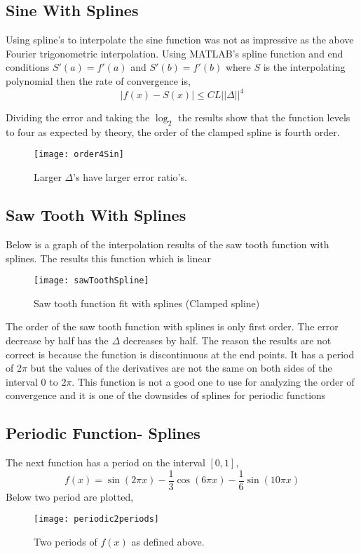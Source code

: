 \documentclass[]{article}
\begin{document}
\subsection*{Sine With Splines}
Using spline's to interpolate the sine function was not as impressive as the above Fourier trigonometric interpolation. Using MATLAB's spline function and end conditions $ S'(a) = f'(a) $ and $ S'(b) = f'(b) $ where $ S $ is the interpolating polynomial then the rate of convergence is, 
\[
| f(x) - S(x)| \leq C L ||\Delta||^4 
\]

Dividing the error and taking the $ \log_2 $ the results show that the function levels to four as expected by theory, the order of the clamped spline is fourth order. 
\begin{figure}[H]
	\centering
	\texttt{[image: order4Sin]}
	\caption{Larger $ \Delta $'s have larger error ratio's.}
\end{figure}

\subsection*{Saw Tooth With Splines}
Below is a graph of the interpolation results of the saw tooth function with splines. The results this function which is linear
\begin{figure}[H]
	\centering
	\texttt{[image: sawToothSpline]}
	\caption{Saw tooth function fit with splines (Clamped spline)}
\end{figure}

The order of the saw tooth function with splines is only first order. The error decrease by half has the $ \Delta $ decreases by half. The reason the results are not correct is because the function is discontinuous at the end points. It has a period of 2$ \pi $ but the values of the derivatives are not the same on both sides of the interval 0 to $ 2\pi $. This function is not a good one to use for analyzing the order of convergence and it is one of the downsides of splines for periodic functions

\subsection*{Periodic Function- Splines}
The next function has a period on the interval $ [0,1] $, 
\[
f(x) = \sin(2\pi x) - \frac{1}{3} \cos(6\pi x) - \frac{1}{6} \sin(10\pi x)
 \]
 Below two period are plotted, 
\begin{figure}[H]
	\centering
	\texttt{[image: periodic2periods]}
	\caption{Two periods of $ f(x) $ as defined above.}
\end{figure}
 
\end{document}
